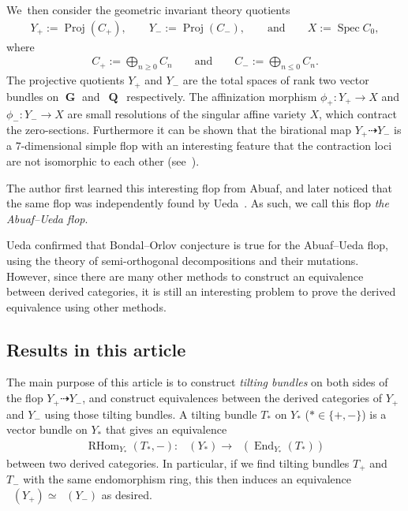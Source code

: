 \documentclass[pdftex]{sigma}
\DeclareMathOperator{\D}{D^b}
\DeclareMathOperator{\End}{End}
\DeclareMathOperator{\G}{\mathbf{G}}
\DeclareMathOperator{\Proj}{Proj}
\DeclareMathOperator{\Q}{\mathbf{Q}}
\DeclareMathOperator{\RHom}{RHom}
\DeclareMathOperator{\Spec}{Spec}
\numberwithin{equation}{section}
\begin{document}
We~then consider the geometric invariant theory quotients
\begin{gather*}
Y_+ := \Proj(C_+),\qquad
Y_- := \Proj(C_-),\qquad \text{and} \qquad
X := \Spec C_0,
\end{gather*}
where
\begin{gather*}
C_+ := \bigoplus_{n \geq 0} C_n \qquad \text{and} \qquad C_- := \bigoplus_{n \leq 0} C_n.
\end{gather*}
The projective quotients $Y_+$ and $Y_-$ are the total spaces of rank two vector bundles on $\G$ and~$\Q$~respectively.
The affinization morphism $\phi_+\colon Y_+ \to X$ and $\phi_-\colon Y_- \to X$ are small resolutions of the singular affine variety $X$,
which contract the zero-sections.
Furthermore it can be shown that the birational map $Y_+ \dashrightarrow Y_-$ is a $7$-dimensional simple flop with an interesting feature
that the contraction loci are not isomorphic to each other (see~\cite{Ued16}).

The author first learned this interesting flop from Abuaf,
and later noticed that the same flop was independently found by Ueda~\cite{Ued16}.
As such, we call this flop \textit{the Abuaf--Ueda flop}.

Ueda confirmed that Bondal--Orlov conjecture is true for the Abuaf--Ueda flop, using the theory of semi-orthogonal decompositions and their mutations.
However, since there are many other methods to construct an equivalence between derived categories,
it is still an interesting problem to prove the derived equivalence using other methods.

\subsection{Results in this article}
The main purpose of this article is to construct \textit{tilting bundles} on both sides of the flop $Y_+ \dashrightarrow Y_-$,
and construct equivalences between the derived categories of $Y_+$ and $Y_-$ using those tilting bundles.
A tilting bundle $T_{\ast}$ on $Y_{\ast}$ ($\ast \in \{ +, - \}$) is a vector bundle on $Y_{\ast}$ that gives an equivalence
\begin{gather*}
\RHom_{Y_{\ast}}(T_{\ast}, -)\colon \ \D(Y_{\ast}) \to \D(\End_{Y_{\ast}}(T_{\ast}))
\end{gather*}
between two derived categories.
In particular, if we find tilting bundles $T_+$ and $T_-$ with the same endomorphism ring, this then induces an equivalence
$\D(Y_+) \simeq \D(Y_-)$ as desired.
\end{document}
